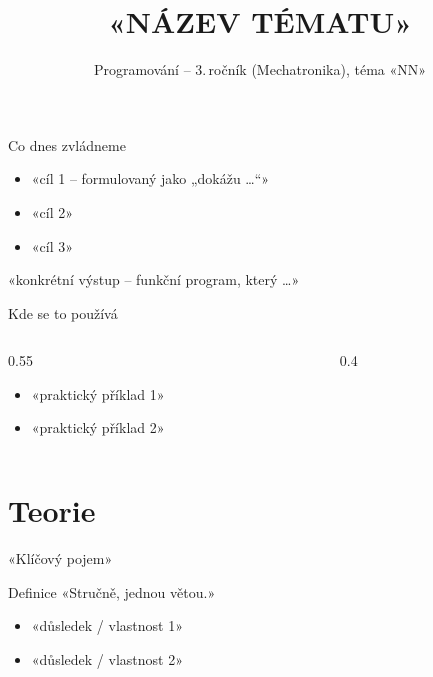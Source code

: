 \documentclass[12pt,aspectratio=169]{beamer}
\title{«NÁZEV TÉMATU»}
\subtitle{Programování -- 3.\,ročník (Mechatronika), téma «NN»}
\begin{document}
\maketitle

\begin{keyframe}{Co dnes zvládneme}
  \begin{itemize}
    \item «cíl 1 -- formulovaný jako „dokážu …“»
    \item «cíl 2»
    \item «cíl 3»
  \end{itemize}
  \vfill
   «konkrétní výstup -- funkční program, který …»
\end{keyframe}

\begin{frame}{Kde se to používá}
  \begin{columns}[T]
    \begin{column}{0.55\textwidth}
      \begin{itemize}
        \item «praktický příklad 1»
        \item «praktický příklad 2»
      \end{itemize}
    \end{column}
    \begin{column}{0.4\textwidth}
    \end{column}
  \end{columns}
\end{frame}

\section{Teorie}

\begin{frame}{«Klíčový pojem»}
  \begin{block}{Definice}
    «Stručně, jednou větou.»
  \end{block}
  \begin{itemize}
    \item «důsledek / vlastnost 1»
    \item «důsledek / vlastnost 2»
  \end{itemize}
\end{frame}
\end{document}
